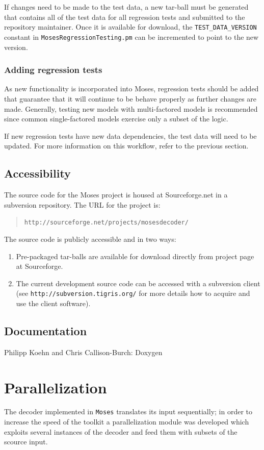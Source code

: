 \documentclass[11pt]{report}
\theoremstyle{plain}
\begin{document}
{If changes need to be made to the test data, a new tar-ball must be
generated that contains all of the test data for all regression
tests and submitted to the repository maintainer.  Once it is
available for download, the \texttt{TEST\_DATA\_VERSION} constant in
\texttt{MosesRegressionTesting.pm} can be incremented to point to
the new version.

\subsubsection{Adding regression tests}
As new functionality is incorporated into Moses, regression tests
should be added that guarantee that it will continue to be behave
properly as further changes are made.  Generally, testing new models
with multi-factored models is recommended since common
single-factored models exercise only a subset of the logic.

If new regression tests have new data dependencies, the test data
will need to be updated.  For more information on this workflow,
refer to the previous section.

\subsection{Accessibility}
The source code for the Moses project is housed at Sourceforge.net
in a subversion repository.  The URL for the project is:

\begin{quote}
    \texttt{http://sourceforge.net/projects/mosesdecoder/}
\end{quote}

The source code is publicly accessible and in two ways:
\begin{enumerate}
  \item Pre-packaged tar-balls are available for download directly
  from project page at Sourceforge.
  \item The current development source code can be accessed with a subversion client (see \texttt{http://subversion.tigris.org/}
for more details how to acquire and use the client software).
\end{enumerate}


\subsection{Documentation}
{\sc Philipp Koehn and Chris Callison-Burch: Doxygen}

\section{Parallelization}
The decoder implemented in {\tt Moses} translates its input sequentially; in order to increase 
the speed of the toolkit a parallelization module was developed which exploits several instances of the decoder and feed them with subsets of the scource input.


}
\end{document}
